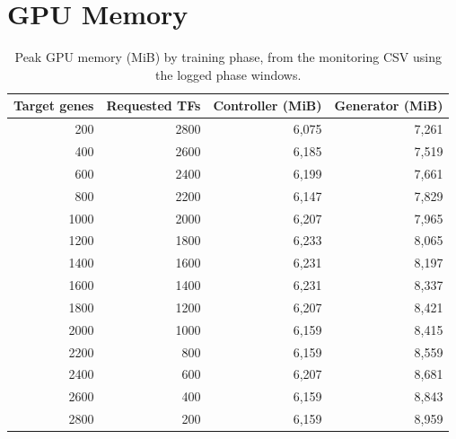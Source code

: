 \documentclass[11pt]{article}
\begin{document}
\section{GPU Memory}
\begin{table}[H]\centering
\caption{Peak GPU memory (MiB) by training phase, from the monitoring CSV using the logged phase windows.}
\label{tab:gpu}
\begin{tabular}{rrrr}\toprule Target genes & Requested TFs & Controller (MiB) & Generator (MiB) \\ \midrule
200 & 2800 & 6,075 & 7,261 \\
400 & 2600 & 6,185 & 7,519 \\
600 & 2400 & 6,199 & 7,661 \\
800 & 2200 & 6,147 & 7,829 \\
1000 & 2000 & 6,207 & 7,965 \\
1200 & 1800 & 6,233 & 8,065 \\
1400 & 1600 & 6,231 & 8,197 \\
1600 & 1400 & 6,231 & 8,337 \\
1800 & 1200 & 6,207 & 8,421 \\
2000 & 1000 & 6,159 & 8,415 \\
2200 & 800 & 6,159 & 8,559 \\
2400 & 600 & 6,207 & 8,681 \\
2600 & 400 & 6,159 & 8,843 \\
2800 & 200 & 6,159 & 8,959 \\
\bottomrule\end{tabular}\end{table}
\end{document}
